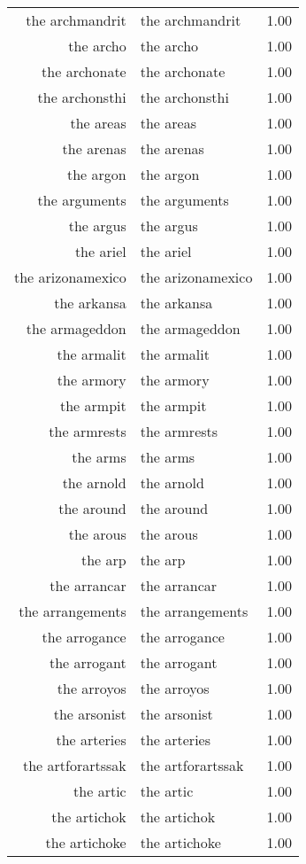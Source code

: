 \begin{table}[ht]
\begin{tabular}{rlr}
  the archmandrit & the archmandrit & 1.00 \\ 
  the archo & the archo & 1.00 \\ 
  the archonate & the archonate & 1.00 \\ 
  the archonsthi & the archonsthi & 1.00 \\ 
  the areas & the areas & 1.00 \\ 
  the arenas & the arenas & 1.00 \\ 
  the argon & the argon & 1.00 \\ 
  the arguments & the arguments & 1.00 \\ 
  the argus & the argus & 1.00 \\ 
  the ariel & the ariel & 1.00 \\ 
  the arizonamexico & the arizonamexico & 1.00 \\ 
  the arkansa & the arkansa & 1.00 \\ 
  the armageddon & the armageddon & 1.00 \\ 
  the armalit & the armalit & 1.00 \\ 
  the armory & the armory & 1.00 \\ 
  the armpit & the armpit & 1.00 \\ 
  the armrests & the armrests & 1.00 \\ 
  the arms & the arms & 1.00 \\ 
  the arnold & the arnold & 1.00 \\ 
  the around & the around & 1.00 \\ 
  the arous & the arous & 1.00 \\ 
  the arp & the arp & 1.00 \\ 
  the arrancar & the arrancar & 1.00 \\ 
  the arrangements & the arrangements & 1.00 \\ 
  the arrogance & the arrogance & 1.00 \\ 
  the arrogant & the arrogant & 1.00 \\ 
  the arroyos & the arroyos & 1.00 \\ 
  the arsonist & the arsonist & 1.00 \\ 
  the arteries & the arteries & 1.00 \\ 
  the artforartssak & the artforartssak & 1.00 \\ 
  the artic & the artic & 1.00 \\ 
  the artichok & the artichok & 1.00 \\ 
  the artichoke & the artichoke & 1.00 \\ 

\end{tabular}
\end{table}
